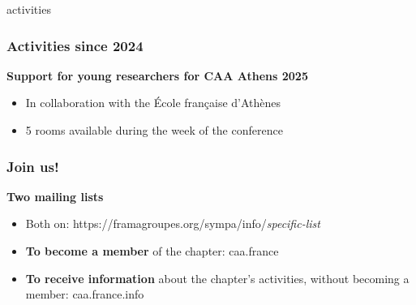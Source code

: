 \documentclass[t,aspectratio=169,xcolor=dvipsnames]{beamer}
\begin{document}

\begin{frame}{activities}

    \frametitle{Activities since 2024}

    \begin{block}{\textbf{Support for young researchers for CAA Athens 2025}}
       
        \begin{itemize}
            \item In collaboration with the École française d'Athènes
            \item 5 rooms available during the week of the conference %
        \end{itemize}

    \end{block}

\end{frame}


\begin{frame}
	
	\frametitle{Join us!}
	
	\begin{block}{\textbf{Two mailing lists %
		}}
		
		\begin{itemize}
			\item Both on: https://framagroupes.org/sympa/info/\textit{specific-list}
			\item \textbf{To become a member} of the chapter: caa.france
			\item \textbf{To receive information} about the chapter's activities, without becoming a member: caa.france.info
		\end{itemize}
		
	\end{block}
	
\end{frame}

\end{document}

